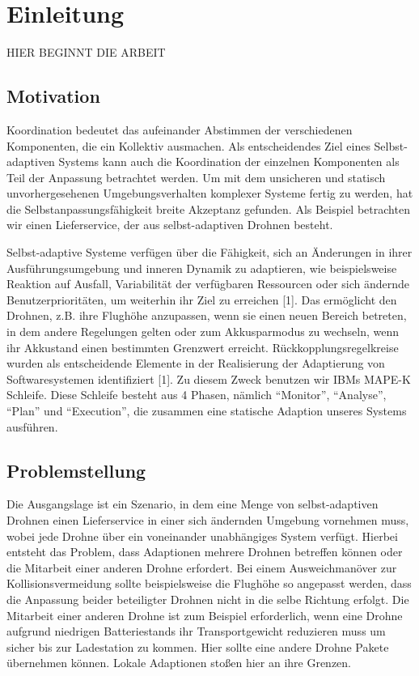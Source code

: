 \documentclass[a4paper,titlepage,onecolumn,twoside,12pt]{article}
\begin{document}
\section{Einleitung}
\label{sec:einleitung}
%
%
%
%
HIER BEGINNT DIE ARBEIT
%
%
%
%
\subsection{Motivation}
\label{subsec:motivation}
Koordination bedeutet das aufeinander Abstimmen  der verschiedenen Komponenten, die ein Kollektiv ausmachen. Als entscheidendes Ziel eines Selbst-adaptiven 
Systems kann auch die Koordination der einzelnen Komponenten als Teil der Anpassung betrachtet werden. 
Um mit dem unsicheren und statisch unvorhergesehenen Umgebungsverhalten komplexer Systeme fertig zu werden, hat die Selbstanpassungsfähigkeit breite 
Akzeptanz gefunden.
Als Beispiel betrachten wir einen Lieferservice, der aus selbst-adaptiven Drohnen besteht.
 
Selbst-adaptive Systeme verfügen über die Fähigkeit, sich an Änderungen in ihrer Ausführungsumgebung und inneren Dynamik zu adaptieren, wie beispielsweise 
Reaktion auf Ausfall, Variabilität der verfügbaren Ressourcen oder sich ändernde Benutzerprioritäten, um weiterhin ihr Ziel zu erreichen [1]. Das 
ermöglicht den Drohnen, z.B. ihre Flughöhe anzupassen, wenn sie einen neuen Bereich betreten, in dem andere Regelungen gelten oder zum Akkusparmodus zu 
wechseln, wenn ihr Akkustand einen bestimmten Grenzwert erreicht. Rückkopplungsregelkreise wurden als entscheidende Elemente in der Realisierung der 
Adaptierung von Softwaresystemen identifiziert [1]. Zu diesem Zweck benutzen wir IBMs MAPE-K Schleife. Diese Schleife besteht aus 4 Phasen, nämlich 
“Monitor”, “Analyse”, “Plan” und “Execution”, die zusammen eine statische Adaption unseres Systems ausführen.
\subsection{Problemstellung}
\label{subsec:problem}
Die Ausgangslage ist ein Szenario, in dem eine Menge von selbst-adaptiven Drohnen einen Lieferservice in einer sich ändernden Umgebung vornehmen muss,
wobei jede Drohne über ein voneinander unabhängiges System verfügt. Hierbei entsteht das Problem, dass Adaptionen mehrere Drohnen betreffen können oder die 
Mitarbeit einer anderen Drohne erfordert. Bei einem Ausweichmanöver zur Kollisionsvermeidung sollte beispielsweise die Flughöhe so angepasst werden, dass 
die Anpassung beider beteiligter Drohnen nicht in die selbe Richtung erfolgt. Die Mitarbeit einer anderen Drohne ist zum Beispiel erforderlich, wenn eine 
Drohne aufgrund niedrigen Batteriestands ihr Transportgewicht reduzieren muss um sicher bis zur Ladestation zu kommen. Hier sollte eine andere Drohne 
Pakete übernehmen können. Lokale Adaptionen stoßen hier an ihre Grenzen. 
\end{document}
